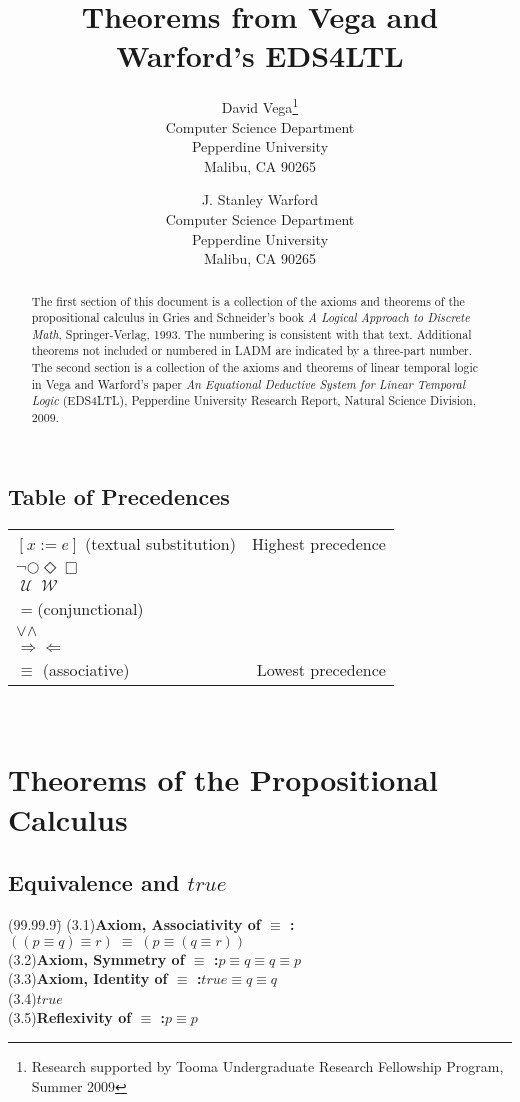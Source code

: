 \documentclass[fleqn, leqno]{article}
\title{Theorems from Vega and Warford's EDS4LTL}
\author{David Vega\thanks{Research supported by Tooma Undergraduate Research Fellowship Program, Summer 2009}\\
   Computer Science Department\\
   Pepperdine University\\
   Malibu, CA 90265
   \and
   J. Stanley Warford\\
   Computer Science Department\\
   Pepperdine University\\
   Malibu, CA 90265}
\date{} %
\newcommand{\lgap}{2pt}                             %
\newcommand{\llgap}{6pt}                            %
\newcommand{\equivs}{\ensuremath{\;\equiv\;}}       %
\newcommand{\impl}{\ensuremath{\Rightarrow}}        %
\newcommand{\foll}{\ensuremath{\Leftarrow}}         %
\newcommand{\Until}{\;\mathcal{U}\;}
\newcommand{\Wait}{\;\mathcal{W}\;}
\newcommand{\Next}{\bigcirc}
\newcommand{\Event}{\Diamond}
\newcommand{\Always}{\Box}
\begin{document}
\maketitle

\begin{abstract}
The first section of this document is a collection of the axioms and theorems of the
propositional calculus in Gries and Schneider's
book \textit{A Logical Approach to Discrete Math}, Springer-Verlag, 1993.
The numbering is consistent with that text.
Additional theorems not included or numbered in LADM are indicated by a three-part
number.
The second section is a collection of the axioms and theorems of linear temporal logic
in Vega and Warford's paper \textit{An Equational Deductive System for Linear Temporal Logic}
(EDS4LTL),
Pepperdine University Research Report, Natural Science Division, 2009.
\end{abstract}

\subsection*{Table of Precedences}

\begin{tabular}{lr}
\hline
$[x := e]$ (textual substitution) & Highest precedence\\
$\neg$\quad $\Next$\quad $\Event$\quad $\Always$ &\\
$\Until$\quad $\Wait$ &\\
$=$\quad (conjunctional) &\\
$\lor$\quad $\land$ &\\
$\impl$\quad $\foll$ &\\
$\equiv$ \quad (associative) & Lowest precedence\\
\hline
\end{tabular}\\[\llgap]

\section*{Theorems of the Propositional Calculus}

\subsection*{Equivalence and $true$}
\begin{tabbing}
(99.99.9)\;\=\kill
(3.1)\>\textbf{Axiom, Associativity of $\equiv$ :}\quad $((p\equiv q) \equiv r)\equivs (p\equiv (q\equiv r))$\\[\lgap]
(3.2)\>\textbf{Axiom, Symmetry of $\equiv$ :}\quad $p\equiv q \equiv q\equiv p$\\[\lgap]
(3.3)\>\textbf{Axiom, Identity of $\equiv$ :}\quad $true\equiv q \equiv q$\\[\lgap]
(3.4)\>$true$\\[\lgap]
(3.5)\>\textbf{Reflexivity of $\equiv$ :}\quad $p\equiv p$\\
\end{tabbing}
\end{document}
